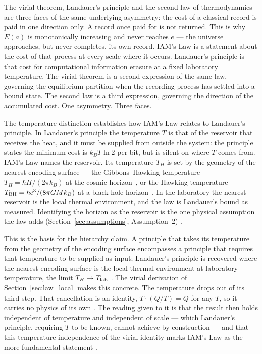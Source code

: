 The virial theorem, Landauer's principle and the second law of thermodynamics are three faces of the same underlying asymmetry: the cost of a
classical record is paid in one direction only. A record once paid for is not returned. This is why $E(a)$ is monotonically increasing and never reaches
$e$ --- the universe approaches, but never completes, its own record. IAM's Law is a statement about the cost of that process at every scale where it
occurs. Landauer's principle is that cost for computational information erasure at a fixed laboratory temperature. The virial theorem is a second
expression of the same law, governing the equilibrium partition when the recording process has settled into a bound state. The second law is a third
expression, governing the direction of the accumulated cost. One asymmetry. Three faces. \interp

The temperature distinction establishes how IAM's Law relates to Landauer's principle. In Landauer's principle the temperature $T$ is that of the reservoir
that receives the heat, and it must be supplied from outside the system: the principle states the minimum cost is $k_BT\ln2$ per bit, but is silent on
where $T$ comes from. IAM's Law names the reservoir. Its temperature $T_H$ is set by the geometry of the nearest encoding surface --- the Gibbons--Hawking
temperature $T_H=\hbar H/(2\pi k_B)$ at the cosmic horizon~\cite{GibbonsHawking1977}, or the Hawking temperature $T_{\rm BH}=\hbar c^3/(8\pi GMk_B)$ at a
black-hole horizon~\cite{Hawking1975}. In the laboratory the nearest reservoir is the local thermal environment, and the law is Landauer's bound as measured.
Identifying the horizon as the reservoir is the one physical assumption the law adds (Section~\ref{sec:assumptions}, Assumption~2) \conjecture.

This is the basis for the hierarchy claim. A principle that takes its temperature from the geometry of the encoding surface encompasses a principle
that requires that temperature to be supplied as input; Landauer's principle is recovered where the nearest encoding surface is the local thermal
environment at laboratory temperature, the limit $T_H\to T_{\rm lab}$ \interp. The virial derivation of Section~\ref{sec:law_local} makes this concrete.
The temperature drops out of its third step. That cancellation is an identity, $T\cdot(Q/T)=Q$ for any $T$, so it carries no physics of its own
\derived. The reading given to it is that the result then holds independent of temperature and independent of scale --- which Landauer's principle,
requiring $T$ to be known, cannot achieve by construction --- and that this temperature-independence of the virial identity marks IAM's Law as the more
fundamental statement \interp.

